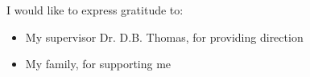 \documentclass[../thesis.tex]{subfiles}
\begin{document}
\cleardoublepage


\begin{acknowledgements}

I would like to express gratitude to:

\begin{itemize}
 \item My supervisor Dr. D.B. Thomas, for providing direction
 \vspace*{3mm}
 \item My family, for supporting me
\end{itemize}

\end{acknowledgements}
\end{document}
